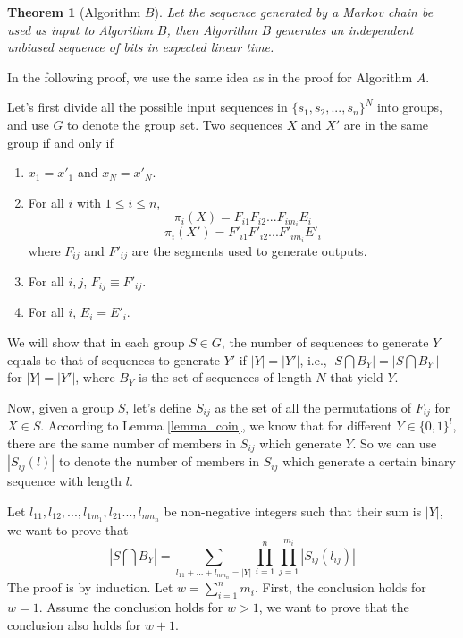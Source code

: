 \documentclass[journal]{IEEEtran}
\newtheorem{Theorem}{Theorem}
\def\pmu{\equiv}
\begin{document}
\begin{Theorem}[Algorithm $B$]
Let the sequence
generated by a Markov chain be used as input to Algorithm $B$, then Algorithm $B$
generates an independent unbiased sequence of bits in expected linear time.
\end{Theorem}

\proof In the following proof, we use the same idea as in the proof for Algorithm $A$.

Let's first divide all the possible input sequences in $\{s_1, s_2, ..., s_n\}^N$ into groups, and use $G$ to denote the group set. Two sequences $X$ and $X'$ are in the same group if and only if

\begin{enumerate}
\item $x_1=x'_1$ and $x_N=x'_N$.
  \item For all $i$ with $1\leq i\leq n$,
  $$\pi_i(X)=F_{i1}F_{i2}...F_{im_i}E_i$$
$$\pi_i(X')=F'_{i1}F'_{i2}...F'_{im_i}E'_i$$
where $F_{ij}$ and $F'_{ij}$ are the segments used to generate outputs.
  \item For all $i,j$, $F_{ij}\pmu F'_{ij}$.
  \item For all $i$, $E_i=E'_i$.
\end{enumerate}

We will show that in each group $S\in G$, the number of sequences to generate $Y$ equals to that of sequences to generate $Y'$ if $|Y|=|Y'|$, i.e., $|S\bigcap B_Y|=|S\bigcap B_{Y'}|$
for $|Y|=|Y'|$, where $B_Y$ is the set of sequences of length $N$ that yield $Y$.

Now, given a group $S$, let's define $S_{ij}$ as the set of
all the permutations of $F_{ij}$ for $X\in S$. According to Lemma \ref{lemma_coin}, we know that for different $Y\in \{0,1\}^{l}$,
there are  the same number of members in $S_{ij}$ which generate $Y$. So we can use
$|S_{ij}(l)|$ to denote the number of members in $S_{ij}$ which generate a certain binary sequence with length $l$.

Let $l_{11},l_{12},...,l_{1m_1},l_{21}...,l_{nm_n}$ be non-negative integers such that their sum is $|Y|$,
we want to prove that
$$|S\bigcap B_Y|=\sum_{l_{11}+...+l_{nm_n}=|Y|}\prod_{i=1}^n\prod_{j=1}^{m_i}|S_{ij}(l_{ij})|$$
The proof is by induction. Let $w=\sum_{i=1}^n m_i$. First, the conclusion holds
for $w=1$. Assume the conclusion holds for $w>1$, we want to prove that
the conclusion also holds for $w+1$.
\end{document}
